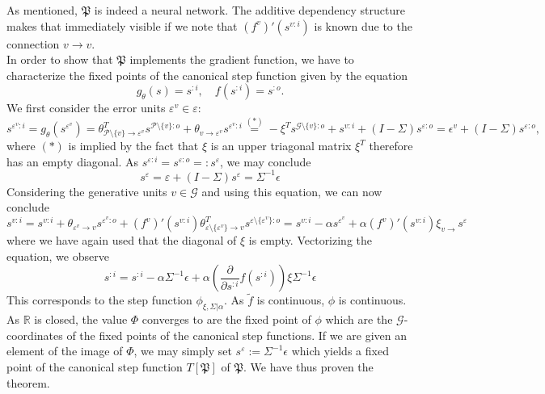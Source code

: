 \documentclass[a4paper,11pt]{report}
\begin{document}
\begin{Bew}
As mentioned, $\mathfrak{P}$ is indeed a neural network. The additive dependency structure makes that immediately visible if we note that $\left(f^v\right)'(s^{v:i})$ is known due to the connection $v\to v$.\\
In order to show that $\mathfrak{P}$ implements the gradient function, we have to characterize the fixed points of the canonical step function given by the equation
\[
g_{\theta}(s)=s^{:i},
\quad
f(s^{:i})=s^{:o}.
\]
We first consider the error units $\varepsilon^v\in\varepsilon$:
\[
s^{\varepsilon^v:i}=g_{\theta}(s^{\varepsilon^v})=\theta_{\mathcal{P}\setminus\{v\}\to \varepsilon^v}^Ts^{\mathcal{P}\setminus\{v\}:o}+\theta_{v\to \varepsilon^v}s^{\varepsilon^v:i}\overset{(*)}{=}-\xi^Ts^{\mathcal{G}\setminus\{v\}:o}+s^{v:i}+(I-\Sigma)s^{\varepsilon:o}=\epsilon^v+(I-\Sigma)s^{\varepsilon:o},
\]
where $(*)$ is implied by the fact that $\xi$ is an upper triagonal matrix $\xi^T$ therefore has an empty diagonal. As $s^{\varepsilon:i}=s^{\varepsilon:o}=:s^{\varepsilon}$, we may conclude
\[
s^{\varepsilon}=\varepsilon+(I-\Sigma)s^{\varepsilon}=\Sigma^{-1}\epsilon
\]
Considering the generative units $v\in\mathcal{G}$ and using this equation, we can now conclude
\[
s^{v:i}=s^{v:i}+\theta_{\varepsilon^v\to v}s^{\varepsilon^v:o}+\left(f^v\right)'(s^{v:i})\theta_{\varepsilon\setminus\{\varepsilon^v\}\to v}^Ts^{\varepsilon\setminus\{\varepsilon^v\}:o}=s^{v:i}-\alpha s^{\varepsilon^v}+\alpha\left(f^v\right)'(s^{v:i})\xi_{v\to} s^{\varepsilon}
\]
where we have again used that the diagonal of $\xi$ is empty. Vectorizing the equation, we observe
\[
s^{:i}=s^{:i}-\alpha \Sigma^{-1}\epsilon+\alpha\left(\frac{\partial}{\partial s^{:i}}f(s^{:i})\right)\xi\Sigma^{-1}\epsilon
\]
This corresponds to the step function $\phi_{\xi,\Sigma|\alpha}$. As $\tilde{f}$ is continuous, $\phi$ is continuous. As $\mathbb{R}$ is closed, the value $\Phi$ converges to are the fixed point of $\phi$ which are the $\mathcal{G}$-coordinates of the fixed points of the canonical step functions. If we are given an element of the image of $\Phi$, we may simply set $s^{\varepsilon}:=\Sigma^{-1}\epsilon$ which yields a fixed point of the canonical step function $T[\mathfrak{P}]$ of $\mathfrak{P}$. We have thus proven the theorem.
\end{Bew}
\end{document}
